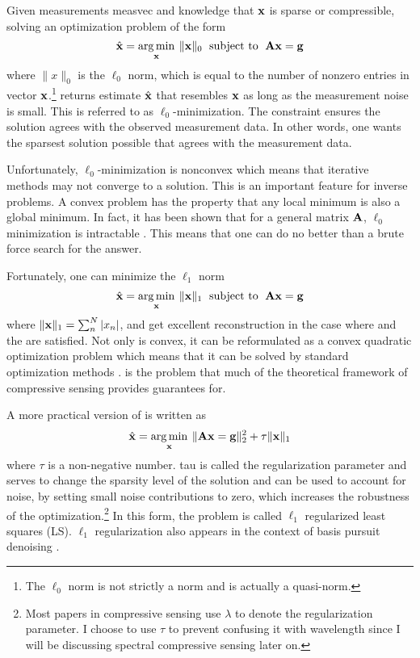 Given measurements \gls{measvec} and knowledge that $\mathbf{x}$ is sparse or compressible, solving an optimization problem of the form 
\begin{equation}
	\hat{ \mathbf{x} } = \operatorname*{arg\,min}_{\mathbf{x}} \: \| \mathbf{x} \|_{0} \text{\; subject to \;} \mathbf{A}\mathbf{x} = \mathbf{g}
	\label{eq:l0min}
\end{equation}
where $\| x \|_{0}$ is the $\ell_0$ norm, which is equal to the number of nonzero entries in vector $\mathbf{x}$.\footnote{The $\ell_0$ norm is not strictly a norm and is actually a quasi-norm.}  returns estimate $\hat{ \mathbf{x} }$ that resembles $\mathbf{x}$ as long as the measurement noise is small. This is referred to as $\ell_0$-minimization. The constraint ensures the solution agrees with the observed measurement data. In other words, one wants the sparsest solution possible that agrees with the measurement data. 

Unfortunately, $\ell_0$-minimization is nonconvex which means that iterative methods may not converge to a solution. This is an important feature for inverse problems. A convex problem has the property that any local minimum is also a global minimum. In fact, it has been shown that for a general matrix $\mathbf{A}$, $\ell_0$ minimization is intractable \cite{aggarwal2007data}. This means that one can do no better than a brute force search for the answer.

Fortunately, one can minimize the $\ell_1$ norm 
\begin{equation}
	\hat{ \mathbf{x} } = \operatorname*{arg\,min}_{\mathbf{x}} \: \| \mathbf{x} \|_{1} \text{\; subject to \;} \mathbf{A}\mathbf{x} = \mathbf{g}
	\label{eq:l1min}
\end{equation}
where $\| \mathbf{x} \|_1 = \sum_{n}^{N}|x_n|$, and get excellent reconstruction in the case where  and the  are satisfied. Not only is  convex, it can be reformulated as a convex quadratic optimization problem which means that it can be solved by standard optimization methods \cite{donoho2006compressed, candes2006robust, foucart2013mathematical}.  is the problem that much of the theoretical framework of \gls{compressive sensing} provides guarantees for. 

A more practical version of  is written as
%
\begin{equation}
	\hat{ \mathbf{x} } = \operatorname*{arg\,min}_{\mathbf{x}} \: \| \mathbf{Ax} = \mathbf{g} \|_{2}^{2} + \tau \| \mathbf{x} \|_1
	\label{eq:l1regls}
\end{equation}
%
where $\tau$ is a non-negative number. \gls{tau} is called the regularization parameter and serves to change the sparsity level of the solution and can be used to account for noise, by setting small noise contributions to zero, which increases the robustness of the optimization.\footnote{Most papers in compressive sensing use $\lambda$ to denote the regularization parameter. I choose to use $\tau$ to prevent confusing it with wavelength since I will be discussing spectral compressive sensing later on.} In this form, the problem is called $\ell_1$ regularized least squares (LS). $\ell_1$ regularization also appears in the context of basis pursuit denoising \cite{chen2001atomic}. 


